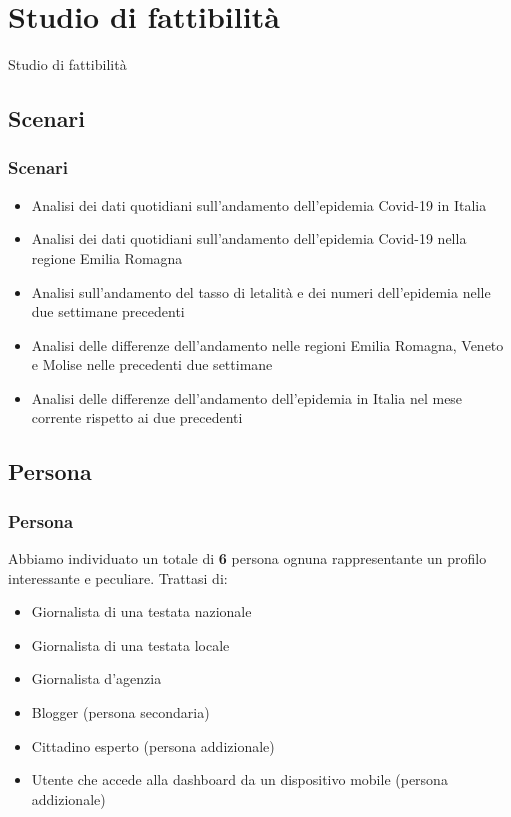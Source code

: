 \documentclass[handout]{beamer}
\begin{document}
	\section{Studio di fattibilità}
		\begin{frame}
			\centering
			\begin{Huge}
				Studio di fattibilità
			\end{Huge}
		\end{frame}

		\subsection{Scenari}
		\begin{frame}
			\frametitle{Scenari}
			\begin{itemize}[<+->]
				\item Analisi dei dati quotidiani sull'andamento dell'epidemia Covid-19 in Italia\\
				\item Analisi dei dati quotidiani sull'andamento dell'epidemia Covid-19 nella regione Emilia Romagna\\
				\item Analisi sull'andamento del tasso di letalità e dei numeri dell'epidemia nelle due settimane precedenti\\
				\item Analisi delle differenze dell'andamento nelle regioni Emilia Romagna, Veneto e Molise nelle precedenti due settimane\\
				\item Analisi delle differenze dell'andamento dell'epidemia in Italia nel mese corrente rispetto ai due precedenti\\
			\end{itemize}
		\end{frame}

		\subsection{Persona}
		\begin{frame}
			\frametitle{Persona}
			Abbiamo individuato un totale di \textbf{6} persona ognuna rappresentante un profilo interessante e peculiare. Trattasi di:
			\begin{itemize}[<+->]
				\item Giornalista di una testata nazionale\\
				\item Giornalista di una testata locale\\
				\item Giornalista d'agenzia\\
				\item Blogger (persona secondaria)\\
				\item Cittadino esperto (persona addizionale)\\
				\item Utente che accede alla dashboard da un dispositivo mobile (persona addizionale)\\
			\end{itemize}
		\end{frame}
\end{document}
